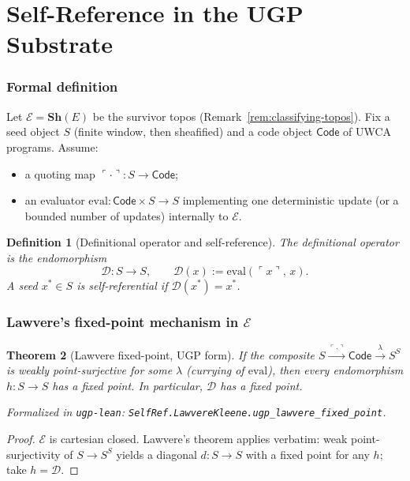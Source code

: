 \documentclass[12pt]{article}
\newtheorem{theorem}{Theorem}[section]
\newtheorem{definition}[theorem]{Definition}
\numberwithin{equation}{section}
\begin{document}
\section{Self-Reference in the UGP Substrate}\label{sec:selfref}

\subsubsection{Formal definition}\label{subsec:selfref-def}
Let $\mathcal{E}=\mathbf{Sh}(E)$ be the survivor topos (Remark~\ref{rem:classifying-topos}). Fix a seed object $S$ (finite window, then sheafified) and a code object $\mathsf{Code}$ of UWCA programs. Assume:
\begin{itemize}[leftmargin=1.1em]
\item a quoting map $\ulcorner\cdot\urcorner: S \to \mathsf{Code}$;
\item an evaluator $\mathrm{eval}:\mathsf{Code}\times S\to S$ implementing one deterministic update (or a bounded number of updates) internally to $\mathcal{E}$.
\end{itemize}

\begin{definition}[Definitional operator and self-reference]\label{def:selfref}
The \emph{definitional operator} is the endomorphism
\[
\mathcal{D}:S \longrightarrow S,\qquad \mathcal{D}(x):=\mathrm{eval}(\ulcorner x\urcorner,\,x).
\]
A seed $x^\ast\in S$ is \emph{self-referential} if $\mathcal{D}(x^\ast)=x^\ast$.
\end{definition}

\subsubsection{Lawvere's fixed-point mechanism in $\mathcal{E}$}\label{subsec:lawvere}
\begin{theorem}[Lawvere fixed-point, UGP form]\label{thm:lawvere-ugp}
If the composite $S\xrightarrow{\ulcorner\cdot\urcorner}\mathsf{Code}\xrightarrow{\lambda} S^S$ is weakly point-surjective for some $\lambda$ (currying of $\mathrm{eval}$), then every endomorphism $h:S\to S$ has a fixed point. In particular, $\mathcal{D}$ has a fixed point.

\noindent\emph{Formalized in} \texttt{ugp-lean}: \texttt{SelfRef.LawvereKleene.ugp\_lawvere\_fixed\_point}.
\end{theorem}
\begin{proof}
$\mathcal{E}$ is cartesian closed. Lawvere's theorem applies verbatim: weak point-surjectivity of $S\to S^S$ yields a diagonal $d:S\to S$ with a fixed point for any $h$; take $h=\mathcal{D}$.
\end{proof}
\end{document}
